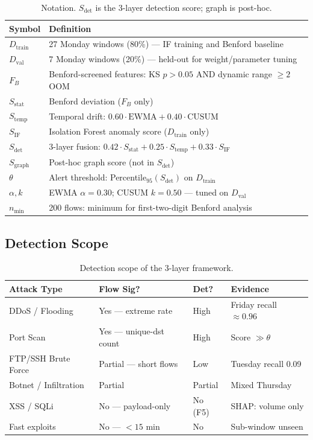 \documentclass[journal,10pt,twoside]{IEEEtran}
\newcommand{\sdet}{$S_{\mathrm{det}}$}
\newcommand{\dtrain}{$D_{\mathrm{train}}$}
\newcommand{\dval}{$D_{\mathrm{val}}$}
\begin{document}
\begin{table}[t]
\caption{Notation. \sdet{} is the 3-layer detection score;
  graph is post-hoc.}
\label{tab:notation}
\centering\small
\begin{tabular}{@{}lL{5.0cm}@{}}
\toprule
\textbf{Symbol} & \textbf{Definition} \\
\midrule
$D_{\mathrm{train}}$ & 27 Monday windows (80\%) --- IF training
  and Benford baseline \\
$D_{\mathrm{val}}$   & 7 Monday windows (20\%) --- held-out for
  weight/parameter tuning \\
$F_B$  & Benford-screened features: KS $p{>}0.05$
  AND dynamic range $\ge2$ OOM \\
$S_{\mathrm{stat}}$  & Benford deviation ($F_B$ only) \\
$S_{\mathrm{temp}}$  & Temporal drift:
  $0.60{\cdot}\text{EWMA}+0.40{\cdot}\text{CUSUM}$ \\
$S_{\mathrm{IF}}$    & Isolation Forest anomaly score
  (\dtrain{} only) \\
$S_{\mathrm{det}}$   & 3-layer fusion:
  $0.42{\cdot}S_{\mathrm{stat}}
   +0.25{\cdot}S_{\mathrm{temp}}
   +0.33{\cdot}S_{\mathrm{IF}}$ \\
$S_{\mathrm{graph}}$ & Post-hoc graph score (not in \sdet{}) \\
$\theta$ & Alert threshold:
  Percentile$_{95}(S_{\mathrm{det}})$ on \dtrain{} \\
$\alpha,k$ & EWMA $\alpha{=}0.30$; CUSUM $k{=}0.50$ ---
  tuned on \dval{} \\
$n_{\min}$ & 200 flows: minimum for first-two-digit
  Benford analysis \\
\bottomrule
\end{tabular}
\end{table}

\subsection{Detection Scope}

\begin{table}[t]
\caption{Detection scope of the 3-layer framework.}
\label{tab:scope}
\centering\small
\begin{tabular}{@{}L{1.7cm}L{1.55cm}P{0.9cm}L{2.1cm}@{}}
\toprule
\textbf{Attack Type} & \textbf{Flow Sig?}
  & \textbf{Det?} & \textbf{Evidence} \\
\midrule
DDoS / Flooding     & Yes --- extreme rate        & High
  & Friday recall ${\approx}0.96$ \\
Port Scan           & Yes --- unique-dst count    & High
  & Score $\gg\theta$ \\
FTP/SSH Brute Force & Partial --- short flows     & Low
  & Tuesday recall 0.09 \\
Botnet / Infiltration & Partial                   & Partial
  & Mixed Thursday \\
XSS / SQLi          & No --- payload-only         & No (F5)
  & SHAP: volume only \\
Fast exploits       & No --- ${<}15$ min          & No
  & Sub-window unseen \\
\bottomrule
\end{tabular}
\end{table}
\end{document}
